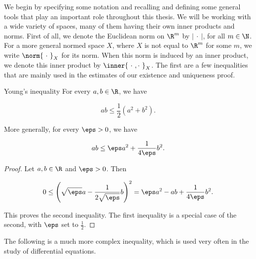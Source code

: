 We begin by specifying some notation and recalling and defining some general tools that play an important role throughout this thesis. We will be working with a wide variety of spaces, many of them having their own inner products and norms. First of all, we denote the Euclidean norm on $\R^m$ by $\left|\ \cdot\ \right|$, for all $m \in \N$. For a more general normed space $X$, where $X$ is not equal to $\R^m$ for some $m$, we write $\norm{\ \cdot\ }_X$ for its norm. When this norm is induced by an inner product, we denote this inner product by $\inner{\ \cdot\ , \cdot\ }_X$. The first are a few inequalities that are mainly used in the estimates of our existence and uniqueness proof.
\begin{lemma}{Young's inequality}{}
    For every $a, b \in \R$, we have

    \begin{equation*}
        ab \leq \frac{1}{2} \left(a^2 + b^2\right) .
    \end{equation*}

    \noindent
    More generally, for every $\eps > 0$, we have

    \begin{equation*}
        ab \leq \eps a^2 + \frac{1}{4 \eps} b^2 .
    \end{equation*}
\end{lemma}

\begin{proof}
    Let $a, b \in \R$ and $\eps > 0$. Then

    \begin{equation*}
        0 \leq \left(\sqrt{\eps} a - \frac{1}{2 \sqrt{\eps}} b\right)^2 = \eps a^2 - ab + \frac{1}{4 \eps} b^2 .
    \end{equation*}

    \noindent
    This proves the second inequality. The first inequality is a special case of the second, with $\eps$ set to $\frac{1}{2}$.
\end{proof}

The following is a much more complex inequality, which is used very often in the study of differential equations.

